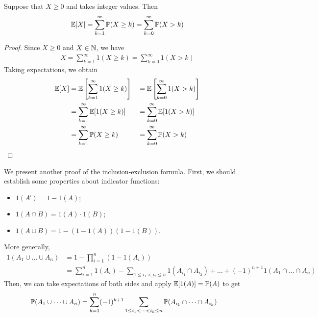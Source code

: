 \documentclass{../template/note}
\begin{document}
    \begin{proposition}
        Suppose that \(X \geq 0\) and takes integer values. Then
        \begin{align*}
            \mathbb E[X] = \sum_{k=1}^\infty \mathbb P(X \geq k) = \sum_{k=0}^\infty \mathbb P(X > k)
        \end{align*}
    \end{proposition}
    
    \begin{proof}
        Since \(X \geq 0\) and \(X \in \mathbb N\), we have
        \begin{align*}
            X = \sum_{k=1}^\infty 1(X \geq k) = \sum_{k=0}^\infty 1(X > k)
        \end{align*}
        Taking expectations, we obtain
        \begin{align*}
            \mathbb E[X] &= \mathbb E\left[\sum_{k=1}^\infty 1(X \geq k)\right] &&= \mathbb E\left[\sum_{k=0}^\infty 1(X > k)\right] \\
            &= \sum_{k=1}^\infty \mathbb E[1(X \geq k)] &&= \sum_{k=0}^\infty \mathbb E[1(X > k)] \\
            &= \sum_{k=1}^\infty \mathbb P(X \geq k) &&= \sum_{k=0}^\infty \mathbb P(X > k)
        \end{align*}
    \end{proof}
    

    We present another proof of the inclusion-exclusion formula. First, we should establish some properties about indicator functions:
    \begin{itemize}
        \item \(1(A^\comp) = 1 - 1(A)\);
        \item \(1(A \cap B) = 1(A) \cdot 1(B)\);
        \item \(1(A \cup B) = 1 - (1-1(A))(1-1(B))\).
    \end{itemize}
    
    More generally,
    \begin{align*}
        1(A_1 \cup \dots \cup A_n) &= 1 - \prod_{i=1}^n (1-1(A_i)) \\
        &= \sum_{i=1}^n 1(A_i) - \sum_{1 \leq i_1 < i_2 \leq n} 1(A_{i_1} \cap A_{i_2}) + \dots + (-1)^{n+1} 1(A_1 \cap \dots \cap A_n)
    \end{align*}
    Then, we can take expectations of both sides and apply \(\mathbb E[1(A)] = \mathbb P(A)\) to get
    \begin{align*}
        \mathbb P(A_1 \cup \dots \cup A_n) &= \sum_{k=1}^n (-1)^{k+1} \sum_{1 \leq i_1 < \dots < i_k \leq n} \mathbb P(A_{i_1} \cap \dots \cap A_{i_k})
    \end{align*}
    
\end{document}

